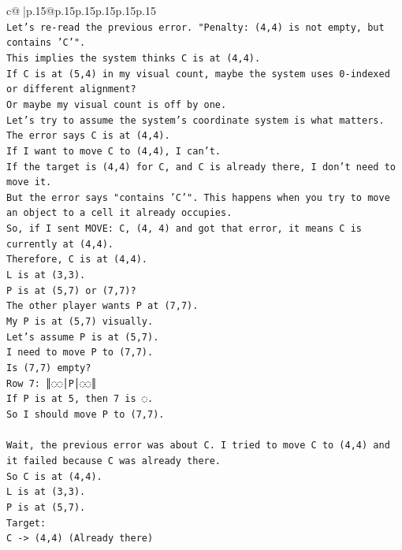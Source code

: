 \documentclass{article}
\begin{document}
{\begin{supertabular}{c@{$\;$}|p{.15\linewidth}@{}p{.15\linewidth}p{.15\linewidth}p{.15\linewidth}p{.15\linewidth}p{.15\linewidth}}
{{{\\ 
\texttt{Let's re{-}read the previous error. "Penalty: (4,4) is not empty, but contains 'C'".} \\
\texttt{This implies the system thinks C is at (4,4).} \\
\texttt{If C is at (5,4) in my visual count, maybe the system uses 0{-}indexed or different alignment?} \\
\texttt{Or maybe my visual count is off by one.} \\
\texttt{Let's try to assume the system's coordinate system is what matters.} \\
\texttt{The error says C is at (4,4).} \\
\texttt{If I want to move C to (4,4), I can't.} \\
\texttt{If the target is (4,4) for C, and C is already there, I don't need to move it.} \\
\texttt{But the error says "contains 'C'". This happens when you try to move an object to a cell it already occupies.} \\
\texttt{So, if I sent MOVE: C, (4, 4) and got that error, it means C is currently at (4,4).} \\
\texttt{Therefore, C is at (4,4).} \\
\texttt{L is at (3,3).} \\
\texttt{P is at (5,7) or (7,7)?} \\
\texttt{The other player wants P at (7,7).} \\
\texttt{My P is at (5,7) visually.} \\
\texttt{Let's assume P is at (5,7).} \\
\texttt{I need to move P to (7,7).} \\
\texttt{Is (7,7) empty?} \\
\texttt{Row 7: ║◌◌│P│◌◌║} \\
\texttt{If P is at 5, then 7 is ◌.} \\
\texttt{So I should move P to (7,7).} \\
\\ 
\texttt{Wait, the previous error was about C. I tried to move C to (4,4) and it failed because C was already there.} \\
\texttt{So C is at (4,4).} \\
\texttt{L is at (3,3).} \\
\texttt{P is at (5,7).} \\
\texttt{Target:} \\
\texttt{C {-}> (4,4) (Already there)} \\
}}}
\end{supertabular}}
\end{document}
